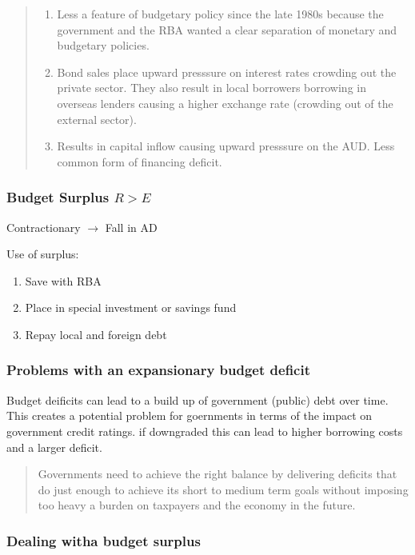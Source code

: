 \documentclass[11pt]{article}
\begin{document}
\begin{quote}
\begin{enumerate}
\item Less a feature of budgetary policy since the late 1980s because the
government and the RBA wanted a clear separation of monetary and
budgetary policies.
\item Bond sales place upward presssure on interest rates crowding out
the private sector. They also result in local borrowers borrowing
in overseas lenders causing a higher exchange rate (crowding out of
the external sector).
\item Results in capital inflow causing upward presssure on the AUD. Less common form of financing deficit.
\end{enumerate}
\end{quote}

\subsubsection{Budget Surplus $R > E$}
\label{sec-1-9-2}

Contractionary $\rightarrow$ Fall in AD

Use of surplus:

\begin{enumerate}
\item Save with RBA
\item Place in special investment or savings fund
\item Repay local and foreign debt
\end{enumerate}

\subsubsection{Problems with an expansionary budget deficit}
\label{sec-1-9-3}

Budget deificits can lead to a build up of government (public) debt
over time. This creates a potential problem for goernments in terms of
the impact on government credit ratings. if downgraded this can lead
to higher borrowing costs and a larger deficit.

\begin{quote}
Governments need to achieve the right balance by delivering deficits
that do just enough to achieve its short to medium term goals without
imposing too heavy a burden on taxpayers and the economy in the
future.
\end{quote}

\subsubsection{Dealing witha budget surplus}
\label{sec-1-9-4}
\end{document}
